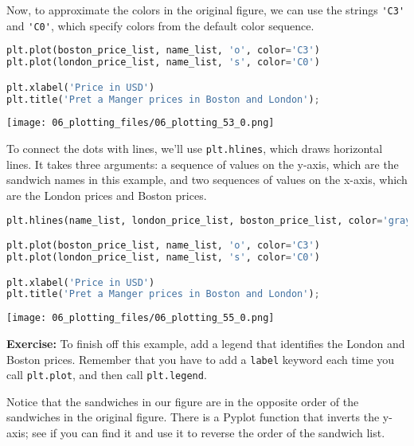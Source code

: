 Now, to approximate the colors in the original figure, we can use the
strings \passthrough{\lstinline!'C3'!} and
\passthrough{\lstinline!'C0'!}, which specify colors from the default
color sequence.

\begin{lstlisting}[language=Python,style=source]
plt.plot(boston_price_list, name_list, 'o', color='C3')
plt.plot(london_price_list, name_list, 's', color='C0')

plt.xlabel('Price in USD')
plt.title('Pret a Manger prices in Boston and London');
\end{lstlisting}

\begin{center}
\texttt{[image: 06\_plotting\_files/06\_plotting\_53\_0.png]}
\end{center}

To connect the dots with lines, we'll use
\passthrough{\lstinline!plt.hlines!}, which draws horizontal lines. It
takes three arguments: a sequence of values on the y-axis, which are the
sandwich names in this example, and two sequences of values on the
x-axis, which are the London prices and Boston prices.

\begin{lstlisting}[language=Python,style=source]
plt.hlines(name_list, london_price_list, boston_price_list, color='gray')

plt.plot(boston_price_list, name_list, 'o', color='C3')
plt.plot(london_price_list, name_list, 's', color='C0')

plt.xlabel('Price in USD')
plt.title('Pret a Manger prices in Boston and London');
\end{lstlisting}

\begin{center}
\texttt{[image: 06\_plotting\_files/06\_plotting\_55\_0.png]}
\end{center}

\textbf{Exercise:} To finish off this example, add a legend that
identifies the London and Boston prices. Remember that you have to add a
\passthrough{\lstinline!label!} keyword each time you call
\passthrough{\lstinline!plt.plot!}, and then call
\passthrough{\lstinline!plt.legend!}.

Notice that the sandwiches in our figure are in the opposite order of
the sandwiches in the original figure. There is a Pyplot function that
inverts the y-axis; see if you can find it and use it to reverse the
order of the sandwich list.

